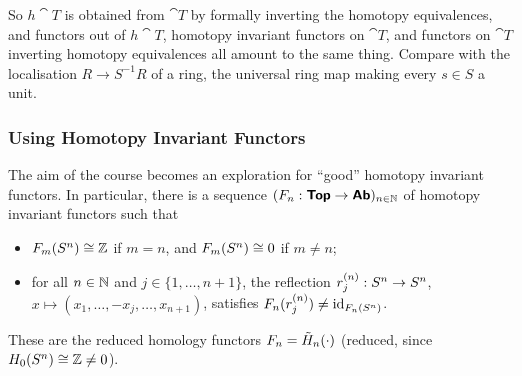 So $h\cat{T}$ is obtained from $\cat{T}$ by formally inverting the homotopy equivalences, and functors out of $h\cat{T}$, homotopy invariant functors on $\cat{T}$, and functors on $\cat{T}$ inverting homotopy equivalences all amount to the same thing. Compare with the localisation $R\to S^{-1}R$ of a ring, the universal ring map making every $s\in S$ a unit.

\newpage

\subsubsection{Using Homotopy Invariant Functors}

The aim of the course becomes an exploration for ``good'' homotopy invariant functors. In particular, there is a sequence $(F_n:\bm{\mathsf{Top}}\to\bm{\mathsf{Ab}})_{n\in\mathbb{N}}$ of homotopy invariant functors such that
\begin{itemize}
  \item $F_m(S^{n})\cong\mathbb{Z}$ if $m=n$, and $F_m(S^{n})\cong0$ if $m\neq n$;
  \item for all $n\in\mathbb{N}$ and $j\in\{1,\dots,n+1\}$, the reflection $r_j^{(n)}:S^{n}\to S^{n}$, $x\mapsto(x_1,\dots,-x_j,\dots,x_{n+1})$, satisfies $F_n(r_j^{(n)})\neq\operatorname{id}_{F_n(S^{n})}$.
\end{itemize}
These are the reduced homology functors $F_n=\tilde{H}_{n}(\cdot)$ (reduced, since $H_{0}(S^{n})\cong\mathbb{Z}\neq0$).

